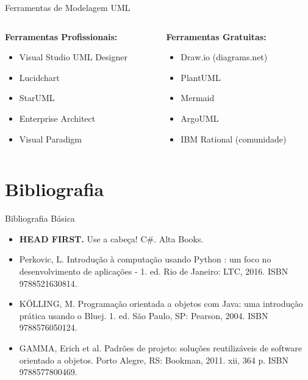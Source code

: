 \documentclass[aspectratio=169]{beamer}
\begin{document}
\begin{frame}{Ferramentas de Modelagem UML}
\begin{columns}
\begin{column}{0.5\textwidth}
\textbf{Ferramentas Profissionais:}
\begin{itemize}
    \item Visual Studio UML Designer
    \item Lucidchart
    \item StarUML
    \item Enterprise Architect
    \item Visual Paradigm
\end{itemize}
\end{column}
\begin{column}{0.5\textwidth}
\textbf{Ferramentas Gratuitas:}
\begin{itemize}
    \item Draw.io (diagrams.net)
    \item PlantUML
    \item Mermaid
    \item ArgoUML
    \item IBM Rational (comunidade)
\end{itemize}
\end{column}
\end{columns}
\end{frame}

\section{Bibliografia}

\begin{frame}{Bibliografia Básica}
\begin{itemize}
    \item \textbf{HEAD FIRST.} Use a cabeça! C\#. Alta Books.
    \item Perkovic, L. Introdução à computação usando Python : um foco no desenvolvimento de aplicações - 1. ed. Rio de Janeiro: LTC, 2016. ISBN 9788521630814.
    \item KÖLLING, M. Programação orientada a objetos com Java: uma introdução prática usando o Bluej. 1. ed. São Paulo, SP: Pearson, 2004. ISBN 9788576050124.
    \item GAMMA, Erich et al. Padrões de projeto: soluções reutilizáveis de software orientado a objetos. Porto Alegre, RS: Bookman, 2011. xii, 364 p. ISBN 9788577800469.
\end{itemize}
\end{frame}
\end{document}
